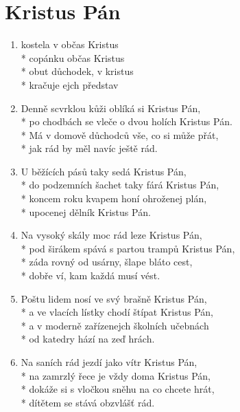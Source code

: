 \section{Kristus Pán}
\begin{enumerate}
\item	{} kostela v  občas  Kristus \\*
	 copánku  občas  Kristus  \\*
	 obut  důchodek,  v kristus \\*
	kračuje ejch představ 

\item	Denně scvrklou kůži oblíká si Kristus Pán,\\*
	po chodbách se vleče o dvou holích Kristus Pán.\\*
	Má v domově důchodců vše, co si může přát, \\*
	jak rád by měl navíc ještě rád.

\item	U běžících pásů taky sedá Kristus Pán,\\*
	do podzemních šachet taky fárá Kristus Pán,\\*
	koncem roku kvapem honí ohroženej plán, \\*
	upocenej dělník Kristus Pán.

\item	Na vysoký skály moc rád leze Kristus Pán,\\*
	pod širákem spává s partou trampů Kristus Pán,\\*
	záda rovný od usárny, šlape bláto cest,\\*
	dobře ví, kam každá musí vést.

\item	Poštu lidem nosí ve svý brašně Kristus Pán,\\*
	a ve vlacích lístky chodí štípat Kristus Pán, \\*
	a v moderně zařízenejch školních učebnách\\*
	od katedry hází na zeď hrách.

\item	Na saních rád jezdí jako vítr Kristus Pán,\\*
	na zamrzlý řece je vždy doma Kristus Pán,\\*
	dokáže si s vločkou sněhu na co chcete hrát,\\*
	dítětem se stává obzvlášť rád.
\end{enumerate}

